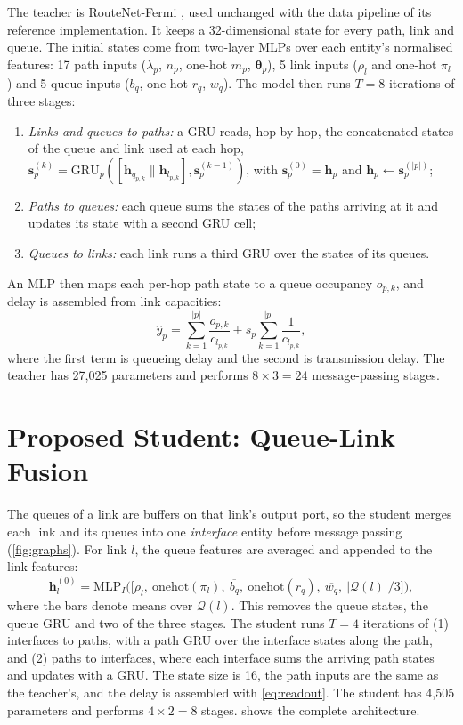 The teacher is RouteNet-Fermi \cite{ferriolgalmes2023routenetfermi}, used unchanged with the data pipeline of its reference implementation. It keeps a 32-dimensional state for every path, link and queue. The initial states come from two-layer MLPs over each entity's normalised features: 17 path inputs ($\lambda_p$, $n_p$, one-hot $m_p$, $\bm{\theta}_p$), 5 link inputs ($\rho_l$ and one-hot $\pi_l$) and 5 queue inputs ($b_q$, one-hot $r_q$, $w_q$). The model then runs $T=8$ iterations of three stages:
\begin{enumerate}
  \item \emph{Links and queues to paths:} a GRU \cite{cho2014gru} reads, hop by hop, the concatenated states of the queue and link used at each hop,
  $\mathbf{s}_p^{(k)} = \mathrm{GRU}_p([\mathbf{h}_{q_{p,k}} \| \mathbf{h}_{l_{p,k}}], \mathbf{s}_p^{(k-1)})$, with $\mathbf{s}_p^{(0)}=\mathbf{h}_p$ and $\mathbf{h}_p \leftarrow \mathbf{s}_p^{(|p|)}$;
  \item \emph{Paths to queues:} each queue sums the states of the paths arriving at it and updates its state with a second GRU cell;
  \item \emph{Queues to links:} each link runs a third GRU over the states of its queues.
\end{enumerate}
An MLP then maps each per-hop path state to a queue occupancy $o_{p,k}$, and delay is assembled from link capacities:
\begin{equation}
\hat{y}_p = \sum_{k=1}^{|p|} \frac{o_{p,k}}{c_{l_{p,k}}} + s_p \sum_{k=1}^{|p|} \frac{1}{c_{l_{p,k}}} ,
\label{eq:readout}
\end{equation}
where the first term is queueing delay and the second is transmission delay. The teacher has 27,025 parameters and performs $8 \times 3 = 24$ message-passing stages.

\section{Proposed Student: Queue-Link Fusion}
\label{sec:student}

The queues of a link are buffers on that link's output port, so the student merges each link and its queues into one \emph{interface} entity before message passing (\cref{fig:graphs}). For link $l$, the queue features are averaged and appended to the link features:
\begin{equation}
\mathbf{h}_l^{(0)} = \mathrm{MLP}_I\big(\big[\rho_l,\ \mathrm{onehot}(\pi_l),\ \overline{b_q},\ \overline{\mathrm{onehot}(r_q)},\ \overline{w_q},\ |\mathcal{Q}(l)|/3\big]\big),
\label{eq:fusion}
\end{equation}
where the bars denote means over $\mathcal{Q}(l)$. This removes the queue states, the queue GRU and two of the three stages. The student runs $T=4$ iterations of (1) interfaces to paths, with a path GRU over the interface states along the path, and (2) paths to interfaces, where each interface sums the arriving path states and updates with a GRU. The state size is 16, the path inputs are the same as the teacher's, and the delay is assembled with \cref{eq:readout}. The student has 4,505 parameters and performs $4 \times 2 = 8$ stages.  shows the complete architecture.

